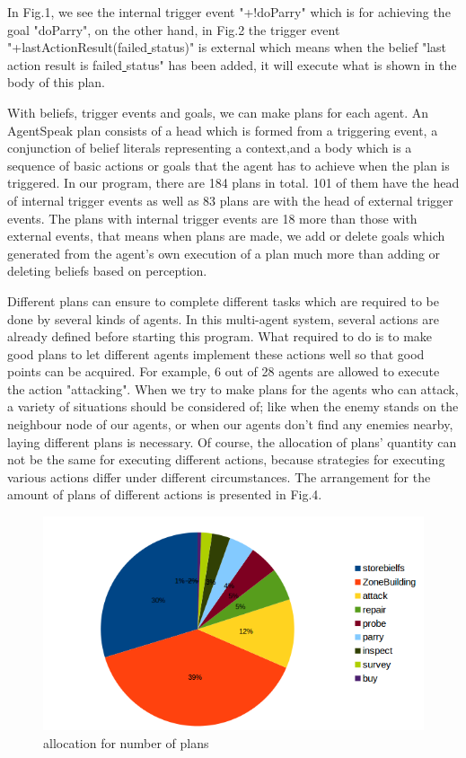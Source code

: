 \documentclass{llncs}
\begin{document}
In Fig.1, we see the internal trigger event "+!doParry" which is for achieving the goal "doParry", on the other hand, in Fig.2 the trigger event "+lastActionResult(failed\underline{ }status)" is external which means when the belief "last action result is failed\underline{ }status" has been added, it will execute what is shown in the body of this plan.

With beliefs, trigger events and goals, we can make plans for each agent. An AgentSpeak plan consists of a head which is formed from a triggering event, a conjunction of belief literals representing a context,and a body which is a sequence of basic actions or goals that the agent has to achieve when the plan is triggered\cite{rafael_BDIAgent_2005}. In our program, there are 184 plans in total. 101 of them have the head of internal trigger events as well as 83 plans are with the head of external trigger events. The plans with internal trigger events are 18 more than those with external events, that means when plans are made, we add or delete goals which generated from the agent’s own execution of a plan much more than adding or deleting beliefs based on perception. 

Different plans can ensure to complete different tasks which are required to be done by several kinds of agents. In this multi-agent system, several actions are already defined before starting this program. What required to do is to make good plans to let different agents implement these actions well so that good points can be acquired. For example, 6 out of 28 agents are allowed to execute the action "attacking". When we try to make plans for the agents who can attack, a variety of situations should be considered of; like when the enemy stands on the neighbour node of our agents, or when our agents don't find any enemies nearby, laying different plans is necessary. Of course, the allocation of plans' quantity can not be the same for executing different actions, because strategies for executing various actions differ under different circumstances. The arrangement for the amount of plans of different actions is presented in Fig.4.
\begin{figure}[H]
\centering
\begin{minipage}[!htbp]{\linewidth}
\includegraphics[width=5.0in]{images/BDI_plan_allocation}
\caption{allocation for number of plans}
\label{fig:plan_allocation}
\end{minipage}
\end{figure}
\end{document}

